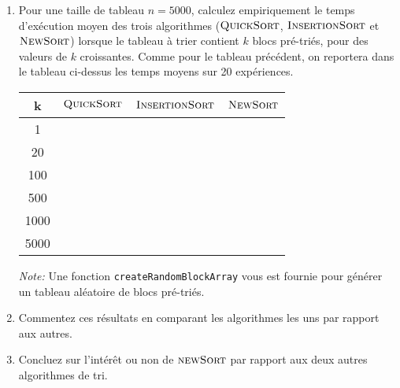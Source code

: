 \documentclass[a4paper,10pt]{article}
\begin{document}
\begin{enumerate}
\item Pour une taille de tableau $n=5000$, calculez empiriquement le temps
d'exécution moyen des trois algorithmes ($\textnormal{\scshape QuickSort}$,
$\textnormal{\scshape InsertionSort}$ et $\textnormal{\scshape NewSort}$) lorsque le tableau à trier
contient $k$ blocs pré-triés, pour des valeurs de $k$
croissantes. Comme pour le tableau précédent, on reportera dans le
tableau ci-dessus les temps moyens sur 20 expériences.

\begin{center}
\begin{tabular}{cccc}
	\hline
	k & $\textnormal{\scshape QuickSort}$ & $\textnormal{\scshape InsertionSort}$ & $\textnormal{\scshape NewSort}$ \\
	\hline
	1 & & &  \\
	20 & & &\\
	100 & & &\\
	500 & & &\\
	1000 & & &\\
	5000 & & &\\
\end{tabular}
\end{center}

{\em Note:} Une fonction \texttt{createRandomBlockArray} vous est fournie pour générer un tableau aléatoire de blocs pré-triés.

\item Commentez ces résultats en comparant les algorithmes les uns par rapport aux autres.
\item Concluez sur l'intérêt ou non de $\textnormal{\scshape newSort}$ par rapport aux deux autres algorithmes de tri.

\end{enumerate}
\end{document}
